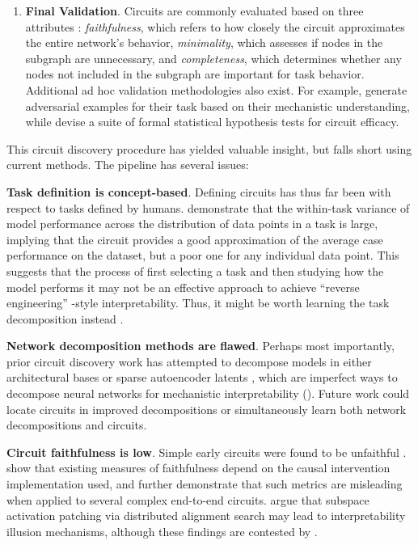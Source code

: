\begin{enumerate}
\item   \textbf{Final Validation}. Circuits are commonly evaluated based on three attributes \citep{Wang_2022_Circuits}: \textit{faithfulness}, which refers to how closely the circuit approximates the entire network's behavior, \textit{minimality}, which assesses if nodes in the subgraph are unnecessary, and \textit{completeness}, which determines whether any nodes not included in the subgraph are important for task behavior. Additional ad hoc validation methodologies also exist. For example, \citet{Wang_2022_Circuits} generate adversarial examples for their task based on their mechanistic understanding, while \citet{shi2024hypothesistestingcircuithypothesis} devise a suite of formal statistical hypothesis tests for circuit efficacy.
\end{enumerate}

This circuit discovery procedure has yielded valuable insight, but falls short using current methods. The pipeline has several issues:

\textbf{Task definition is concept-based}. Defining circuits has thus far been with respect to tasks defined by humans. \citet{miller2024transformercircuitfaithfulnessmetrics} demonstrate that the within-task variance of model performance across the distribution of data points in a task is large, implying that the circuit provides a good approximation of the average case performance on the dataset, but a poor one for any individual data point. This suggests that the process of first selecting a task and then studying how the model performs it may not be an effective approach to achieve “reverse engineering” -style interpretability. Thus, it might be worth learning the task decomposition instead \citep{kaarel2024starting}.

\textbf{Network decomposition methods are flawed}. Perhaps most importantly, prior circuit discovery work has attempted to decompose models in either architectural bases \citep{Wang_2022_Circuits,conmy2023automatedcircuitdiscoverymechanistic} or sparse autoencoder latents \citep{marks2024sparsefeaturecircuitsdiscovering,cunningham2023sparseautoencodershighlyinterpretable}, which are imperfect ways to decompose neural networks for mechanistic interpretability (). Future work could locate circuits in improved decompositions or simultaneously learn both network decompositions and circuits.

\textbf{Circuit faithfulness is low}. Simple early circuits were found to be unfaithful \citep{Chan_2022_InductionHeads, chan2023causal}. \citet{miller2024transformercircuitfaithfulnessmetrics} show that existing measures of faithfulness depend on the causal intervention implementation used, and further demonstrate that such metrics are misleading when applied to several complex end-to-end circuits. \citet{makelov2023subspacelookingforinterpretability} argue that subspace activation patching via distributed alignment search may lead to interpretability illusion mechanisms, although these findings are contested by \citet{wu2024replymakelovetal}.

